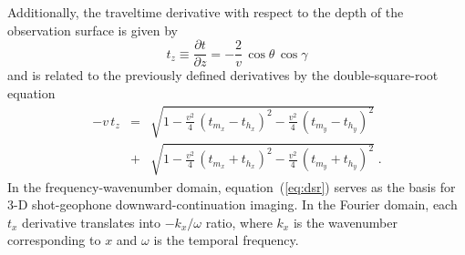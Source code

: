 Additionally, the traveltime derivative with respect to the depth of the
observation surface is given by
\begin{equation}
  \label{eq:tz}
  t_z \equiv \frac{\partial t}{\partial z} = 
  -\frac{2}{v}\,\cos{\theta}\,\cos{\gamma}
\end{equation}
and is related to the previously defined derivatives by the double-square-root
equation
\begin{eqnarray}
  \nonumber
  - v\,t_z & = &  
  \sqrt{1-
    \frac{v^2}{4}\,\left(t_{m_x} - t_{h_x}\right)^2 - 
    \frac{v^2}{4}\,\left(t_{m_y} - t_{h_y}\right)^2} \\
  & + & 
  \sqrt{1-
    \frac{v^2}{4}\,\left(t_{m_x} + t_{h_x}\right)^2 - 
    \frac{v^2}{4}\,\left(t_{m_y} + t_{h_y}\right)^2}\;.
  \label{eq:dsr}
\end{eqnarray}
In the frequency-wavenumber domain, equation~(\ref{eq:dsr}) serves as the
basis for 3-D shot-geophone downward-continuation imaging. In the Fourier
domain, each $t_x$ derivative translates into $-k_x/\omega$ ratio, where $k_x$
is the wavenumber corresponding to $x$ and $\omega$ is the temporal frequency.


